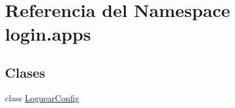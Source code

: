 \hypertarget{namespacelogin_1_1apps}{}\section{Referencia del Namespace login.\+apps}
\label{namespacelogin_1_1apps}
\subsection*{Clases}
\begin{DoxyCompactItemize}
\item 
class \hyperlink{classlogin_1_1apps_1_1_loguear_config}{Loguear\+Config}
\end{DoxyCompactItemize}
